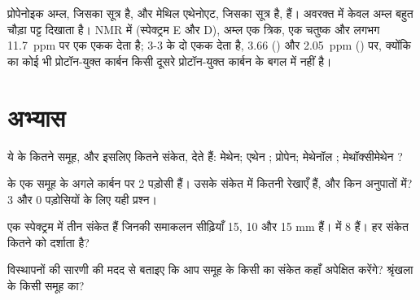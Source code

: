 \begin{example}[दो समावयवी \ce{C3H6O2}]\label{ex:g12:proton-nmr:isomers}
प्रोपेनोइक अम्ल, जिसका सूत्र  है, और मेथिल एथेनोएट, जिसका सूत्र  है,
 हैं। अवरक्त में केवल अम्ल बहुत चौड़ा 
पट्ट दिखाता है। NMR में (स्पेक्ट्रम E और D), अम्ल एक त्रिक, एक चतुष्क और
लगभग \qty{11.7}{ppm} पर एक एकक देता है;  3-3  के दो एकक देता है,
3.66 () और \qty{2.05}{ppm} () पर, क्योंकि  का
कोई भी प्रोटॉन-युक्त कार्बन किसी दूसरे प्रोटॉन-युक्त कार्बन के बगल में नहीं है।
\end{example}

\section{अभ्यास}

\begin{exercise}[$\star$]\label{exo:g12:proton-nmr:1}
ये   के कितने समूह, और इसलिए कितने संकेत, देते हैं:
मेथेन; एथेन ; प्रोपेन; मेथेनॉल
; मेथॉक्सीमेथेन ?
\end{exercise}

\begin{exercise}[$\star$]\label{exo:g12:proton-nmr:2}
 के एक समूह के अगले कार्बन पर 2 पड़ोसी  हैं। उसके संकेत में
कितनी रेखाएँ हैं, और किन अनुपातों में? 3 और
0 पड़ोसियों के लिए यही प्रश्न।
\end{exercise}

\begin{exercise}[$\star$]\label{exo:g12:proton-nmr:3}
एक स्पेक्ट्रम में तीन संकेत हैं जिनकी समाकलन सीढ़ियाँ 15, 10 और
15 mm हैं।  में 8  हैं। हर संकेत कितने  को
दर्शाता है?
\end{exercise}

\begin{exercise}[$\star$]\label{exo:g12:proton-nmr:4}
विस्थापनों की सारणी की मदद से बताइए कि आप  समूह के किसी  का
संकेत कहाँ अपेक्षित करेंगे? श्रृंखला के किसी  समूह का?
\end{exercise}

